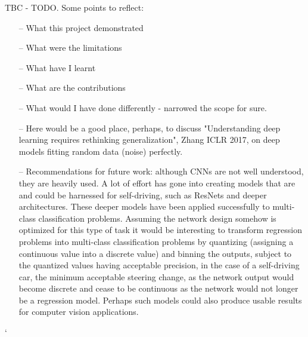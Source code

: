 TBC - TODO. Some points to reflect:
\begin{itemize}
    \item[--] What this project demonstrated
    \item[--] What were the limitations
    \item[--] What have I learnt
    \item[--] What are the contributions
    \item[--] What would I have done differently - narrowed the scope for sure.
    \item[--] Here would be a good place, perhaps, to discuss "Understanding deep learning requires rethinking generalization", Zhang ICLR 2017, on deep models fitting random data (noise) perfectly. 
    \item[--] Recommendations for future work: although CNNs are not well understood, they are heavily used. A lot of effort has gone into creating models that are and could be harnessed for self-driving, such as ResNets and deeper architectures. These deeper models have been applied successfully to multi-class classification problems. Assuming the network design somehow is optimized for this type of task it would be interesting to transform regression problems into multi-class classification problems by quantizing (assigning a continuous value into a discrete value) and binning the outputs, subject to the quantized values having acceptable precision, in the case of a self-driving car, the minimum acceptable steering change, as the network output would become discrete and cease to be continuous as the network would not longer be a regression model.
    Perhaps such models could also produce usable results for computer vision applications.
\end{itemize}


`